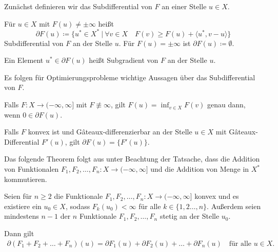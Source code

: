 Zunächst definieren wir das Subdifferential von $F$ an einer Stelle $u\in X$.

\begin{definition}[Subdifferential]
  \label{def:subdifferential}
  Für $u\in X$ mit $F(u)\neq\pm\infty$ heißt
  \begin{equation}
    \label{eq:subdifferential}
    \partial F(u)\coloneqq
    \{u^\ast\in X^\ast\ |\ 
    \forall v\in X\quad F(v)\geq F(u)+\langle u^\ast,v-u\rangle\}  
  \end{equation}
  Subdifferential von $F$ an der Stelle $u$. Für $F(u)=\pm\infty$ ist
  $\partial F(u)\coloneq\emptyset$.

  Ein Element $u^\ast\in\partial F(u)$ heißt Subgradient von $F$ an der Stelle
  $u$.
\end{definition}

Es folgen für Optimierungsprobleme wichtige Aussagen über das Subdifferential 
von $F$.

\begin{theorem}
  \label{thm:extremalprinciple}
  Falls $F: X\to (-\infty,\infty]$ mit $F\nequiv\infty$, gilt
  $F(u)=\inf_{v\in X}F(v)$ genau dann, wenn $0\in\partial F(u)$.
\end{theorem}

\begin{theorem}
  \label{thm:subdiffGateaux}
  Falls $F$ konvex ist und G\^{a}teaux-differenzierbar
  an der Stelle $u\in X$ mit G\^{a}teaux-Differential $F'(u)$,
  gilt $\partial F(u)=\{F'(u)\}$.
\end{theorem}

Das folgende Theorem folgt aus \cite[S. 389, Theorem 47.B]{Zei85} unter 
Beachtung der Tatsache, dass die Addition von Funktionalen 
$F_1,F_2,\ldots,F_n:X\to (-\infty,\infty]$ und die Addition von
Menge in $X^\ast$ kommutieren.

\begin{theorem}
  \label{thm:subdifferentialSumRule}
  Seien für $n\geq 2$ die Funktionale $F_1,F_2,\ldots,F_n: X\to
  (-\infty,\infty]$ konvex und es existiere
  ein $u_0\in X$, sodass $F_k(u_0)<\infty$
  für alle $k\in\{1,2\ldots,n\}$. 
  Außerdem seien mindestens $n-1$ der $n$ Funktionale $F_1,F_2,\ldots,F_n$
  stetig an der Stelle $u_0$.

  Dann gilt 
  \begin{align*}
    \partial (F_1+F_2+\ldots+ F_n)(u) 
    = \partial F_1(u)+\partial F_2(u)+ \ldots + \partial F_n(u) \quad\text{für
    alle } u\in X.
  \end{align*}
\end{theorem}

